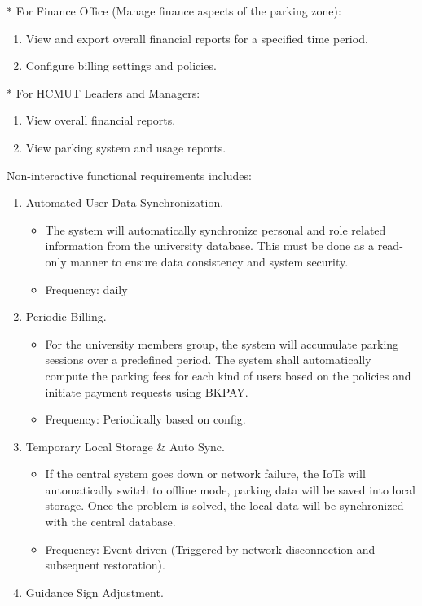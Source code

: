 * For Finance Office (Manage finance aspects of the parking zone):
\begin{enumerate}
    \item View and export overall financial reports for a specified time period.
    \item Configure billing settings and policies.
\end{enumerate}
* For HCMUT Leaders and Managers:
\begin{enumerate}
    \item View overall financial reports.
    \item View parking system and usage reports.
\end{enumerate}
Non-interactive functional requirements includes:
\begin{enumerate}
    \item Automated User Data Synchronization.
    \begin{itemize}
        \item The system will automatically synchronize personal and role related information from the university database. This must be done as a read-only manner to ensure data consistency and system security.
        \item Frequency: daily
    \end{itemize}
    \item Periodic Billing.
    \begin{itemize}
        \item For the university members group, the system will accumulate parking sessions over a predefined period. The system shall automatically compute the parking fees for each kind of users based on the policies and initiate payment requests using BKPAY.
        \item Frequency: Periodically based on config.
    \end{itemize}
    \item Temporary Local Storage \& Auto Sync.
    \begin{itemize}
        \item If the central system goes down or network failure, the IoTs will automatically switch to offline mode, parking data will be saved into local storage. Once the problem is solved, the local data will be synchronized with the central database.
        \item Frequency: Event-driven (Triggered by network disconnection and subsequent restoration).
    \end{itemize}
    \item Guidance Sign Adjustment.

\end{enumerate}
